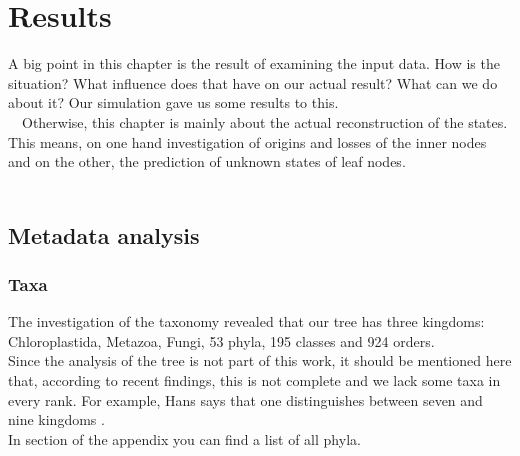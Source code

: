 \chapter{Results}
  A big point in this chapter is the result of examining the input data. How is the situation? What 
    influence does that have on our actual result? What can we do about it? Our simulation gave us 
    some results to this. \\
  Otherwise, this chapter is mainly about the actual reconstruction of the states. This means, on 
    one hand investigation of origins and losses of the inner nodes and on the other, the prediction 
    of unknown states of leaf nodes. \\
   
  \section{Metadata analysis}

    \subsection{Taxa}
      The investigation of the taxonomy revealed that our tree has three kingdoms: Chloroplastida, 
        Metazoa, Fungi, 53 phyla, 195 classes and 924 orders. \\
      Since the analysis of the tree is not part of this work, it should be mentioned here that, 
        according to recent findings, this is not complete and we lack some taxa in every rank. For 
        example, Hans says that one distinguishes between seven and nine kingdoms 
        \cite{CavalierSmith1981}. \\
      In section \pageref{subsec:listPhyla} of the appendix you can find a list of all phyla.
      
